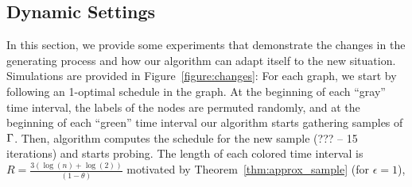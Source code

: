 % 
% 
% 




\subsection{Dynamic Settings}\label{sec:dynset}
In this section, we provide some experiments that demonstrate the changes in the
generating process and how our algorithm can adapt itself to the new situation.
Simulations are provided in Figure~\ref{figure:changes}: For each graph, we
start by following an 1-optimal schedule in the graph. At the beginning of each
``gray'' time interval, the labels of the nodes are permuted randomly, and at
the beginning of each ``green'' time interval our algorithm starts gathering
samples of $\Gamma$. Then, algorithm computes the schedule for the new sample
(??? -- 15 iterations) and starts probing. The length of each colored time
interval is $R = \frac{3(\log(n)+\log(2))}{(1-\theta)}$ motivated by
Theorem~\ref{thm:approx_sample} (for $\epsilon=1$),  



